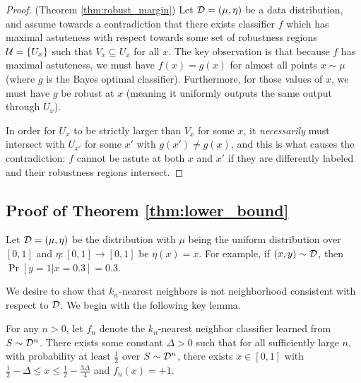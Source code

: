 \begin{proof}
(Theorem \ref{thm:robust_margin}) Let ${\mathcal D} = (\mu, \eta)$ be a data distribution, and assume towards a contradiction that there exists classifier $f$ which has maximal astuteness with respect towards some set of robustness regions ${\mathcal U} = \{U_x\}$ such that $V_x \subseteq U_x$ for all $x$. The key observation is that because $f$ has maximal astuteness, we must have $f(x) = g(x)$ for almost all points $x \sim \mu$ (where $g$ is the Bayes optimal classifier). Furthermore, for those values of $x$, we must have $g$ be robust at $x$ (meaning it uniformly outputs the same output through $U_x$).

In order for $U_x$ to be strictly larger than $V_x$ for some $x$, it \textit{necessarily} must intersect with $U_{x'}$ for some $x'$ with $g(x') \neq g(x)$, and this is what causes the contradiction: $f$ cannot be astute at both $x$ and $x'$ if they are differently labeled and their robustness regions intersect. 
\end{proof}

\subsection{Proof of Theorem \ref{thm:lower_bound}}

Let ${\mathcal D} = (\mu, \eta)$ be the distribution with $\mu$ being the uniform distribution over $[0, 1]$ and $\eta: [0, 1] \to [0, 1]$ be $\eta(x) = x$. For example, if $(x, y) \sim {\mathcal D}$, then $\Pr[y = 1| x = 0.3] = 0.3$. 

We desire to show that $k_n$-nearest neighbors is not neighborhood consistent with respect to ${\mathcal D}$. We begin with the following key lemma.

\begin{lem}\label{cl:delta}
For any $n > 0$, let $f_n$ denote the $k_n$-nearest neighbor classifier learned from $S \sim {\mathcal D}^n$. There exists some constant $\Delta > 0$ such that for all sufficiently large $n$, with probability at least $\frac{1}{2}$ over $S \sim {\mathcal D}^n$, there exists $x \in [0,1]$ with $\frac{1}{2} - \Delta \leq x \leq \frac{1}{2} - \frac{3\Delta}{4}$ and $f_n(x) = +1$.
\end{lem}

